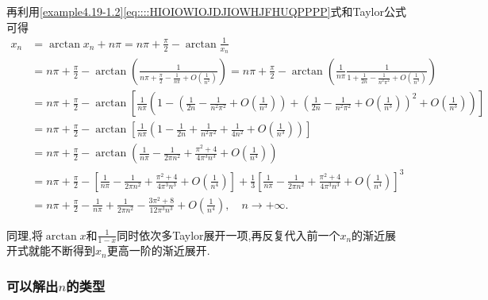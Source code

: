 \documentclass[../../main.tex]{subfiles}%
\begin{document}
\begin{solution}
再利用\eqref{example4.19-1.2}\eqref{eq::::HIOIOWIOJDJIOWHJFHUQPPPP}式和Taylor公式可得
\begin{align*}
x_n&=\arctan x_n+n\pi =n\pi +\frac{\pi}{2}-\arctan \frac{1}{x_n}\\
&=n\pi +\frac{\pi}{2}-\arctan \left( \frac{1}{n\pi +\frac{\pi}{2}-\frac{1}{n\pi}+O\left( \frac{1}{n^2} \right)} \right) =n\pi +\frac{\pi}{2}-\arctan \left( \frac{1}{n\pi}\frac{1}{1+\frac{1}{2n}-\frac{1}{n^2\pi ^2}+O\left( \frac{1}{n^3} \right)} \right)\\
&=n\pi +\frac{\pi}{2}-\arctan \left[ \frac{1}{n\pi}\left( 1-\left( \frac{1}{2n}-\frac{1}{n^2\pi ^2}+O\left( \frac{1}{n^3} \right) \right) +\left( \frac{1}{2n}-\frac{1}{n^2\pi ^2}+O\left( \frac{1}{n^3} \right) \right) ^2+O\left( \frac{1}{n^3} \right) \right) \right]\\
&=n\pi +\frac{\pi}{2}-\arctan \left[ \frac{1}{n\pi}\left( 1-\frac{1}{2n}+\frac{1}{n^2\pi ^2}+\frac{1}{4n^2}+O\left( \frac{1}{n^3} \right) \right) \right]\\
&=n\pi +\frac{\pi}{2}-\arctan \left( \frac{1}{n\pi}-\frac{1}{2\pi n^2}+\frac{\pi ^2+4}{4\pi ^3n^3}+O\left( \frac{1}{n^4} \right) \right)\\
&=n\pi +\frac{\pi}{2}-\left[ \frac{1}{n\pi}-\frac{1}{2\pi n^2}+\frac{\pi ^2+4}{4\pi ^3n^3}+O\left( \frac{1}{n^4} \right) \right] +\frac{1}{3}\left[ \frac{1}{n\pi}-\frac{1}{2\pi n^2}+\frac{\pi ^2+4}{4\pi ^3n^3}+O\left( \frac{1}{n^4} \right) \right] ^3\\
&=n\pi +\frac{\pi}{2}-\frac{1}{n\pi}+\frac{1}{2\pi n^2}-\frac{3\pi ^2+8}{12\pi ^3n^3}+O\left( \frac{1}{n^4} \right) ,\quad n\rightarrow +\infty .
\end{align*}

同理,将$\arctan x$和$\frac{1}{1-x}$同时依次多Taylor展开一项,再反复代入前一个$x_n$的渐近展开式就能不断得到$x_n$更高一阶的渐近展开.
\end{solution}



\subsubsection{可以解出$n$的类型}
\end{document}
